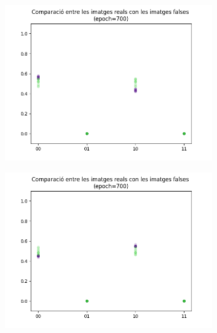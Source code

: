 \begin{figure}[H]
	\begin{subfigure}[b]{.32\linewidth}
		\includegraphics[width=\linewidth]{figures/data/scatter_plot_4.png}
		\caption{}
	\end{subfigure}
	\begin{subfigure}[b]{.32\linewidth}
		\includegraphics[width=\linewidth]{figures/data/scatter_plot_5.png}
		\caption{}
	\end{subfigure}
	\begin{subfigure}[b]{.32\linewidth}

\end{subfigure}
\end{figure}
